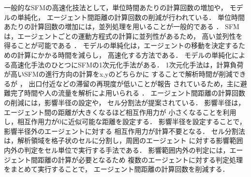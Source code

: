 一般的なSFMの高速化技法として，単位時間あたりの計算回数の増加や，
モデルの単純化，
エージェント間距離の計算回数の削減が行われている．
単位時間あたりの計算回数の増加には，並列処理を用いることが一般的である
\cite{seru_sfm1}\cite{seru_sfm2}
\cite{sfm_gpu1}\cite{sfm_gpu2}\cite{sfm_gpu3}\cite{sfm_gpu4}．
SFMは，エージェントごとの運動方程式の計算に並列性があるため，
高い並列性を得ることが可能である
\cite{mpi1}\cite{mpi2}．
モデルの単純化は，エージェントの移動を決定するための計算にかかる時間を減らし，
高速化する方法である．
モデルの単純化による高速化手法のひとつにSFMの1次元化手法がある．
1次元化手法は，計算負荷が高いSFMの進行方向の計算をx,yのどちらかに
することで解析時間が削減できるが
\cite{1jigen_model}\cite{1jigen_model1}\cite{1jigen_model2}，
出口付近などの滞留の再現度が低いことが報告
されているため，主に避難完了時間や人の流量を解析によ用いられる
\cite{1jigen_katuyou}\cite{1jigen_model_ev1}\cite{1jigen_model_ev2}．
エージェント間距離の計算回数の削減には，影響半径の設定や，
セル分割法が提案されている\cite{cell1}\cite{cell2}．
影響半径は，エージェント間の距離が大きくなるほど相互作用力が
小さくなることを利用し，相互作用力が0に近似可能な距離を設定する．
影響半径を設定することで，影響半径外のエージェントに対する
相互作用力が計算不要となる\cite{eikyo_space}．
セル分割法は，解析領域を格子状のセルに分割し，周囲のエージェント
に対する影響範囲内外の判定をセル単位で実行する手法である．
影響範囲内外の判定には，エージェント間距離の計算が必要となるため
複数のエージェントに対する判定処理をまとめて実行することで，
エージェント間距離の計算回数を削減する．

